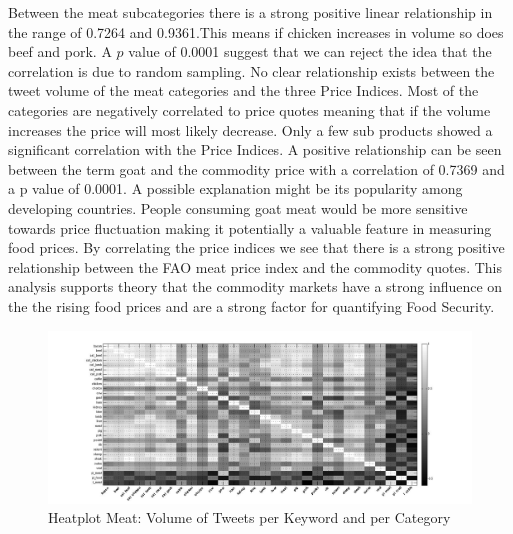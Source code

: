 Between the meat subcategories there is a strong positive linear relationship in the range of 0.7264 and 0.9361.This means if chicken increases in volume so does beef and pork. A $p$ value of 0.0001 suggest that we can reject the idea that the correlation is due to random sampling. No clear relationship exists between the tweet volume of the meat categories and the three Price Indices. Most of the categories are negatively correlated to price quotes meaning that if the volume increases the price will most likely decrease. Only a few sub products showed a significant correlation with the Price Indices. A positive relationship can be seen between the term goat and the commodity price with a correlation of 0.7369 and a p value of 0.0001. A possible explanation might be its popularity among developing countries. People consuming goat meat would be more sensitive towards price fluctuation making it potentially a valuable feature in measuring food prices. By correlating the price indices we see that there is a strong positive relationship between the FAO meat price index and the commodity quotes. This analysis supports \cite{abbott2009} theory that the commodity markets have a strong influence on the the rising food prices and are a strong factor for quantifying Food Security. 



\begin{figure}[H]
        \centering
         \includegraphics[width=1\textwidth ]{img/anal/meat_black}
              
        \caption{Heatplot Meat: Volume of Tweets per Keyword and per Category}
        \label{fig:distribution}
\end{figure}




